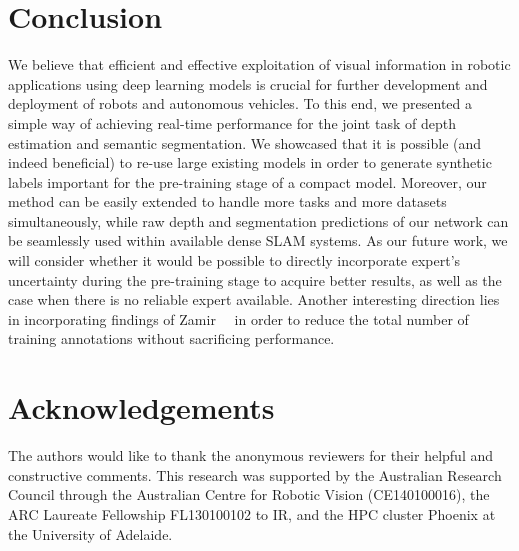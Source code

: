 \documentclass[letterpaper, 10 pt, conference]{ieeeconf}
\begin{document}
\section{Conclusion}
\label{sec:conclusion}

We believe that efficient and effective exploitation of visual information in robotic applications using deep learning models is crucial for further development and deployment of robots and autonomous vehicles. To this end, we presented a simple way of achieving real-time performance for the joint task of depth estimation and semantic segmentation. We showcased that it is possible (and indeed beneficial) to re-use large existing models in order to generate synthetic labels important for the pre-training stage of a compact model. Moreover, our method can be easily extended to handle more tasks and more datasets simultaneously, while raw depth and segmentation predictions of our network can be seamlessly used within available dense SLAM systems. As our future work, we will consider whether it would be possible to directly incorporate expert's uncertainty during the pre-training stage to acquire better results, as well as the case when there is no reliable expert available. Another interesting direction lies in incorporating findings of Zamir~\etal~\cite{zamir2018taskonomy} in order to reduce the total number of training annotations without sacrificing performance.

\section*{Acknowledgements}
The authors would like to thank the anonymous reviewers for their helpful and constructive comments. This research was supported by the Australian Research Council through the Australian Centre for Robotic Vision (CE140100016), the ARC Laureate Fellowship FL130100102 to IR, and the HPC cluster Phoenix at the University of Adelaide.










\end{document}
